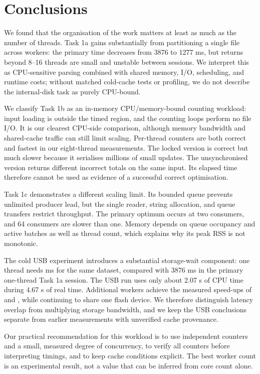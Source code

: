 \chapter{Conclusions}
We found that the organisation of the work matters at least as much as the number of threads. Task 1a gains substantially from partitioning a single file across workers: the primary time decreases from 3876 to 1277 ms, but returns beyond 8--16 threads are small and unstable between sessions. We interpret this as CPU-sensitive parsing combined with shared memory, I/O, scheduling, and runtime costs; without matched cold-cache tests or profiling, we do not describe the internal-disk task as purely CPU-bound.

We classify Task 1b as an in-memory CPU/memory-bound counting workload: input loading is outside the timed region, and the counting loops perform no file I/O. It is our clearest CPU-side comparison, although memory bandwidth and shared-cache traffic can still limit scaling. Per-thread counters are both correct and fastest in our eight-thread measurements. The locked version is correct but much slower because it serialises millions of small updates. The unsynchronised version returns different incorrect totals on the same input. Its elapsed time therefore cannot be used as evidence of a successful correct optimisation.

Task 1c demonstrates a different scaling limit. Its bounded queue prevents unlimited producer lead, but the single reader, string allocation, and queue transfers restrict throughput. The primary optimum occurs at two consumers, and 64 consumers are slower than one. Memory depends on queue occupancy and active batches as well as thread count, which explains why its peak RSS is not monotonic.

The cold USB experiment introduces a substantial storage-wait component: one thread needs \USBOneMs{} ms for the same dataset, compared with 3876 ms in the primary one-thread Task 1a session. The USB run uses only about 2.07 s of CPU time during 4.67 s of real time. Additional workers achieve the measured speed-ups of \USBSpeedTwo{} and \USBSpeedFour{}, while continuing to share one flash device. We therefore distinguish latency overlap from multiplying storage bandwidth, and we keep the USB conclusions separate from earlier measurements with unverified cache provenance.

Our practical recommendation for this workload is to use independent counters and a small, measured degree of concurrency, to verify all counters before interpreting timings, and to keep cache conditions explicit. The best worker count is an experimental result, not a value that can be inferred from core count alone.
